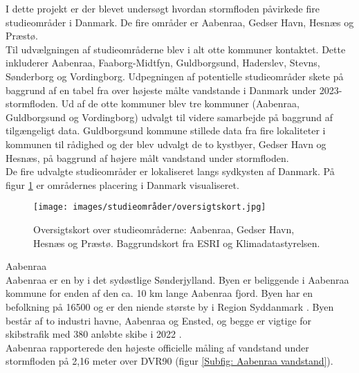 
I dette projekt er der blevet undersøgt hvordan stormfloden påvirkede fire studieområder i Danmark. De fire områder er Aabenraa, Gedser Havn, Hesnæs og Præstø.\\

Til udvælgningen af studieområderne blev i alt otte kommuner kontaktet. Dette inkluderer Aabenraa, Faaborg-Midtfyn, Guldborgsund, Haderslev, Stevns, Sønderborg og Vordingborg. Udpegningen af potentielle studieområder skete på baggrund af en tabel fra \cite{damberg_vaerste_2023} over højeste målte vandstande i Danmark under 2023-stormfloden. 
Ud af de otte kommuner blev tre kommuner (Aabenraa, Guldborgsund og Vordingborg) udvalgt til videre samarbejde på baggrund af tilgængeligt data. Guldborgsund kommune stillede data fra fire lokaliteter i kommunen til rådighed og der blev udvalgt de to kystbyer, Gedser Havn og Hesnæs, på baggrund af højere målt vandstand under stormfloden.\\

De fire udvalgte studieområder er lokaliseret langs sydkysten af Danmark. På figur \ref{Figur: Oversigtskort} er områdernes placering i Danmark visualiseret.
\begin{figure}[H]
    \centering
    \texttt{[image: images/studieområder/oversigtskort.jpg]}
    \caption{Oversigtskort over studieområderne: Aabenraa, Gedser Havn, Hesnæs og Præstø. Baggrundskort fra ESRI og Klimadatastyrelsen.}
    \label{Figur: Oversigtskort}
\end{figure}

{\large Aabenraa}\\
Aabenraa er en by i det sydøstlige Sønderjylland. Byen er beliggende i Aabenraa kommune for enden af den ca. 10 km lange Aabenraa fjord. Byen har en befolkning på 16500 og er den niende største by i Region Syddanmark \citep{danmarks_statistisk_mobile_nodate}. Byen består af to industri havne, Aabenraa og Ensted, og begge er vigtige for skibstrafik med 380 anløbte skibe i 2022 \citep{aabenraa_havn_aabenraa-havn-talogfakta2022_2022}.\\
Aabenraa rapporterede den højeste officielle måling af vandstand under stormfloden på 2,16 meter over DVR90 (figur \ref{Subfig: Aabenraa vandstand}). \\

